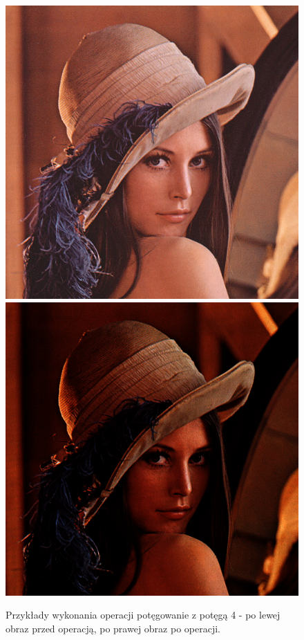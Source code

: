 \documentclass{article}
\begin{document}
\begin{figure}[!htb]
\includegraphics[scale=0.269]{img/lena_24bit.png}  
\includegraphics[scale=0.2]{img/Potegowanie_Obrazu_lena_24bit.png} 
\caption{Przykłady wykonania operacji potęgowanie z potęgą 4 - po lewej obraz przed operacją, po prawej obraz po operacji. }
\end{figure}
\end{document}
